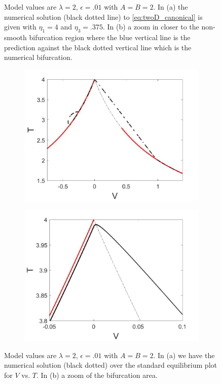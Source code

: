 \begin{figure}[H]
\begin{subfigure}{.5\textwidth}
  \caption{}
\end{subfigure}
\caption{ Model values are $\lambda=2$, $\epsilon=.01$ with $A=B=2$. In (a) the numerical solution (black dotted line) to \eqref{eq:twoD_canonical} is given with $\eta_1=4$ and $\eta_3=.375$. In (b) a zoom in closer to the non-smooth bifurcation region where the blue vertical line is the prediction against the black dotted vertical line which is the numerical bifurcation.}
\label{fig:twoD_slowosc_Vnumerics_large}
\end{figure}

\begin{figure}[H]
\centering
\begin{subfigure}{.5\textwidth}
  \centering
  \includegraphics[width=\linewidth]{twoD/slowosc_Tplot_large.jpg}
  \caption{}
\end{subfigure}%
\begin{subfigure}{.5\textwidth}
  \centering
  \includegraphics[width=\linewidth]{twoD/slowosc_Tplot_large_zoom.jpg}
  \caption{}
\end{subfigure}
\caption{Model values are $\lambda=2$, $\epsilon=.01$ with $A=B=2$. In (a) we have the numerical solution (black dotted) over the standard equilibrium plot for $V$ vs. $T$. In (b) a zoom of the bifurcation area.}
\label{fig:twoD_slowosc_Tnumerics_large}
\end{figure}

